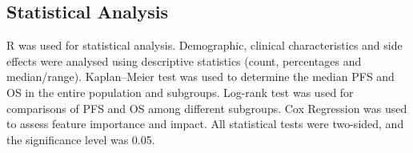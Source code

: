 \subsection{Statistical Analysis}
R was used for statistical analysis. Demographic, clinical characteristics and side effects were analysed using descriptive statistics (count, percentages and median/range). Kaplan–Meier test was used to determine the median PFS and OS in the entire population and subgroups. Log-rank test was used for comparisons of PFS and OS among different subgroups. Cox Regression was used to assess feature importance and impact. All statistical tests were two-sided, and the significance level was 0.05. 








